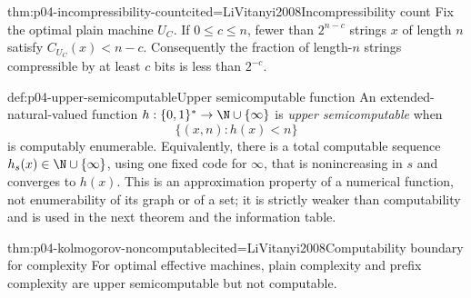 \begin{hbtheorem}{thm:p04-incompressibility-count}{cited=LiVitanyi2008}{Incompressibility count}
Fix the optimal plain machine \(U_C\).  If \(0\leq c\leq n\), fewer than
\(2^{n-c}\) strings \(x\) of length \(n\) satisfy
\(C_{U_C}(x)<n-c\).  Consequently the fraction of length-\(n\) strings
compressible by at least \(c\) bits is less than \(2^{-c}\).
\end{hbtheorem}

\begin{hbdefinition}{def:p04-upper-semicomputable}{Upper semicomputable function}
An extended-natural-valued function
\(h:\{0,1\}^*\to\N\cup\{\infty\}\) is \emph{upper semicomputable} when
\[
 \{(x,n):h(x)<n\}
\]
is computably enumerable.  Equivalently, there is a total computable sequence
\(h_s(x)\in\N\cup\{\infty\}\), using one fixed code for \(\infty\), that is
nonincreasing in \(s\) and converges to \(h(x)\).  This is an approximation
property of a numerical function, not enumerability of its graph or of a set;
it is strictly weaker than computability and is used in the next theorem and
the information table.
\end{hbdefinition}

\begin{hbtheorem}{thm:p04-kolmogorov-noncomputable}{cited=LiVitanyi2008}{Computability boundary for complexity}
For optimal effective machines, plain complexity and prefix complexity are
upper semicomputable but not computable.
\end{hbtheorem}

